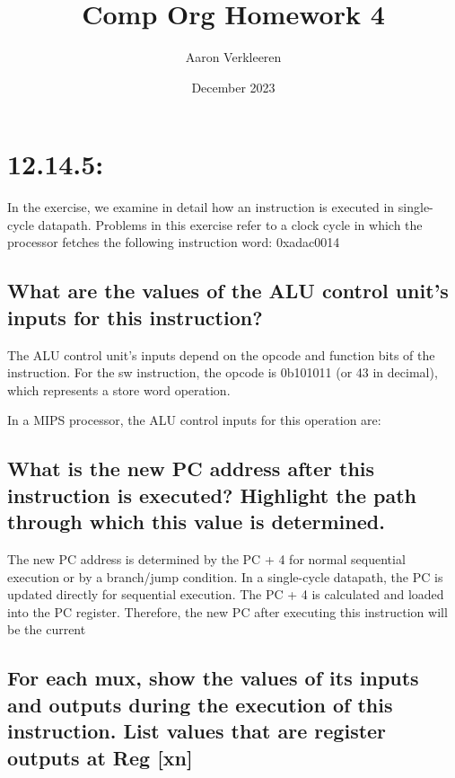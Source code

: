 \documentclass{article}
\title{Comp Org Homework 4}
\author{Aaron Verkleeren }
\date{December 2023}
\begin{document}
\maketitle

\section{12.14.5:}
In the exercise, we examine in detail how an instruction is executed in single-cycle datapath. Problems in this exercise refer to a clock cycle in which the processor fetches the following instruction word: 0xadac0014

\subsection{What are the values of the ALU control unit's inputs for this instruction?}

The ALU control unit's inputs depend on the opcode and function bits of the instruction. For the sw instruction, the opcode is 0b101011 (or 43 in decimal), which represents a store word operation.

In a MIPS processor, the ALU control inputs for this operation are:


\subsection{What is the new PC address after this instruction is executed? Highlight the path through which this value is determined.}

The new PC address is determined by the PC + 4 for normal sequential execution or by a branch/jump condition. In a single-cycle datapath, the PC is updated directly for sequential execution. The PC + 4 is calculated and loaded into the PC register. Therefore, the new PC after executing this instruction will be the current 


\subsection{For each mux, show the values of its inputs and outputs during the execution of this instruction. List values that are register outputs at Reg [xn]}
\end{document}
